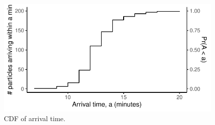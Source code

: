 \begin{knitrout}\small
{}\color{fgcolor}\begin{figure}

{\centering \includegraphics[width=.6\textwidth]{figure/eta_cdf-1} 

}

\caption[CDF of arrival time]{CDF of arrival time.}\label{fig:eta_cdf}
\end{figure}


\end{knitrout}





